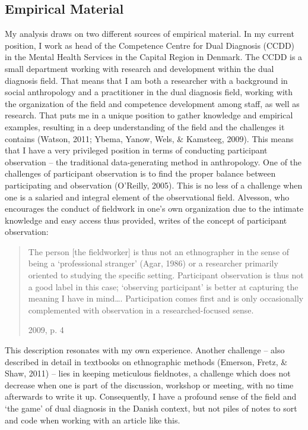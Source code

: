 \begin{multicols}{2}
\chapter{Empirical Material}
My analysis draws on two different sources of empirical material. In my current position, I work as head of the Competence Centre for Dual Diagnosis (CCDD) in the Mental Health Services in the Capital Region in Denmark. The CCDD is a small department working with research and development within the dual diagnosis field. That means that I am both a researcher with a background in social anthropology and a practitioner in the dual diagnosis field, working with the organization of the field and competence development among staff, as well as research. That puts me in a unique position to gather knowledge and empirical examples, resulting in a deep understanding of the field and the challenges it contains (Watson, 2011; Ybema, Yanow, Wels, \& Kamsteeg, 2009). This means that I have a very privileged position in terms of conducting participant observation – the traditional data-generating method in anthropology. One of the challenges of participant observation is to find the proper balance between participating and observation (O'Reilly, 2005). This is no less of a challenge when one is a salaried and integral element of the observational field. Alvesson, who encourages the conduct of fieldwork in one’s own organization due to the intimate knowledge and easy access thus provided, writes of the concept of participant observation: 
    \blockquote[2009, p. 4]{The person [the fieldworker] is thus not an ethnographer in the sense of being a ‘professional stranger’ (Agar, 1986) or a researcher primarily oriented to studying the specific setting. Participant observation is thus not a good label in this case; ‘observing participant’ is better at capturing the meaning I have in mind…. Participation comes first and is only occasionally complemented with observation in a researched-focused sense.}
This description resonates with my own experience. Another challenge – also described in detail in textbooks on ethnographic methods (Emerson, Fretz, \& Shaw, 2011) – lies in keeping meticulous fieldnotes, a challenge which does not decrease when one is part of the discussion, workshop or meeting, with no time afterwards to write it up. Consequently, I have a profound sense of the field and ‘the game’ of dual diagnosis in the Danish context, but not piles of notes to sort and code when working with an article like this.
\par

\end{multicols}
